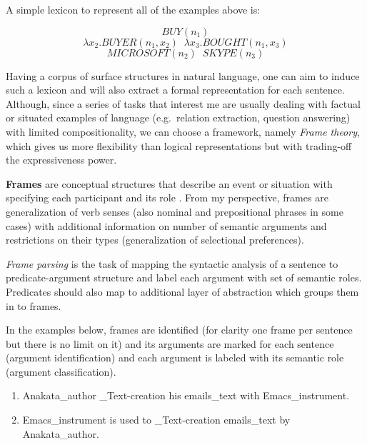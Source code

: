    A simple lexicon to represent all of the examples above is:
  
   $$ BUY(n_1)$$
   $$ \lambda x_2.BUYER(n_1 , x_2) \; \;  \lambda x_3.BOUGHT(n_1 , x_3) $$
   $$ MICROSOFT(n_2) \; \; SKYPE(n_3)$$
   
   Having a corpus of surface structures in natural language, one can aim to
   induce such a lexicon and will also extract a formal representation for each sentence.
   Although, since a series of tasks that interest me are usually dealing with
   factual or situated examples of language (e.g.\ relation extraction,
   question answering) with limited compositionality, we can choose a framework,
   namely \textit{Frame theory}, which gives us more flexibility than logical
   representations but with trading-off the expressiveness power.
   
   \textbf{Frames} are conceptual structures that describe an event or situation
   with specifying each participant and its role \cite{Baker1998}. From my
   perspective, frames are generalization of verb  senses (also nominal and
   prepositional phrases in some cases) with additional information on number
   of semantic arguments and restrictions on their types (generalization of
   selectional preferences).
   
   \textit{Frame parsing} is the task of mapping the
syntactic analysis of a sentence to predicate-argument structure and label each
argument with set of semantic roles. Predicates should also map to additional
layer of abstraction which groups them in to frames.

In the examples below, frames are identified (for clarity one frame per
sentence but there is no limit on it) and its arguments are marked for each
sentence (argument identification) and each argument is labeled with its semantic role (argument classification). 

\begin{enumerate}
  
    \item \lbrack Anakata\rbrack_{author}  
    \rbrack_{Text-creation} his \lbrack
    emails\rbrack_{text} with \lbrack
    Emacs\rbrack_{instrument}.
    \item  \lbrack Emacs\rbrack_{instrument} is
    used to 
    \rbrack_{Text-creation}  \lbrack
    emails\rbrack_{text} by \lbrack
    Anakata\rbrack_{author}.
  \end{enumerate}

